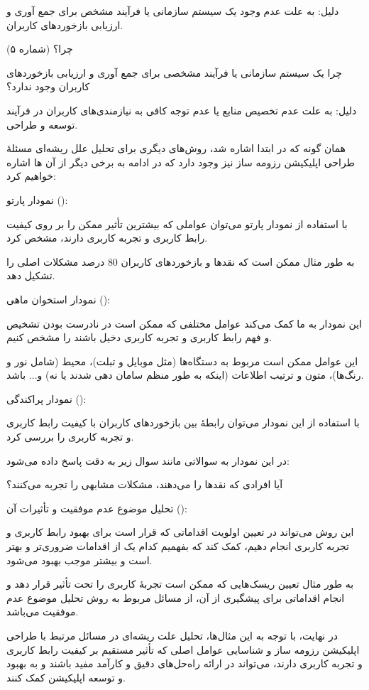 \documentclass[]{article}
\begin{document}
	دلیل: به علت عدم وجود یک سیستم سازمانی یا فرآیند مشخص برای جمع آوری و ارزیابی بازخوردهای کاربران‌.
	
	چرا؟ (شماره ۵)
	
	چرا یک سیستم سازمانی یا فرآیند مشخصی برای جمع آوری و ارزیابی بازخوردهای کاربران‌ وجود ندارد؟
	
	دلیل: به علت عدم تخصیص منابع یا عدم توجه کافی به نیازمندی‌های کاربران در فرآیند توسعه و طراحی.
	
	همان گونه که در ابتدا اشاره شد، روش‌های دیگری برای تحلیل علل ریشه‌ای مسئلۀ طراحی اپلیکیشن رزومه ساز نیز وجود دارد که در ادامه به برخی دیگر از آن ها اشاره خواهیم کرد:
	
	نمودار پارتو ():
	
	با استفاده از نمودار پارتو می‌توان عواملی که بیشترین تأثیر ممکن را بر روی کیفیت رابط کاربری و تجربه کاربری دارند، مشخص کرد.
	
	به طور مثال ممکن است که نقدها و بازخوردهای کاربران 80 درصد مشکلات اصلی را تشکیل دهد.
	
	نمودار استخوان ماهی ():
	
	این نمودار به ما کمک می‌کند عوامل مختلفی که ممکن است در نادرست بودن تشخیص و فهم رابط کاربری و تجربه کاربری دخیل باشند را مشخص کنیم.
	
	این عوامل ممکن است مربوط به دستگاه‌ها (مثل موبایل و تبلت)، محیط (شامل نور و رنگ‌ها)، متون و ترتیب اطلاعات (اینکه به طور منظم سامان دهی شدند یا نه) و... باشد.
	
	نمودار پراکندگی ():
	
	با استفاده از این نمودار می‌توان رابطۀ بین بازخوردهای کاربران با کیفیت رابط کاربری و تجربه کاربری را بررسی کرد. 
	
	در این نمودار به سوالاتی مانند سوال زیر به دقت پاسخ داده می‌شود:
	
	آیا افرادی که نقدها را می‌دهند، مشکلات مشابهی را تجربه می‌کنند؟
	
	تحلیل موضوع عدم موفقیت و تأثیرات آن ():
	
	این روش می‌تواند در تعیین اولویت اقداماتی که قرار است برای بهبود رابط کاربری و تجربه کاربری انجام دهیم، کمک کند که بفهمیم کدام یک از اقدامات ضروری‌تر و بهتر است و بیشتر موجب بهبود می‌شود.
	
	به طور مثال تعیین ریسک‌هایی که ممکن است تجربۀ کاربری را تحت تأثیر قرار دهد و انجام اقداماتی برای پیشگیری از آن، از مسائل مربوط به روش تحلیل موضوع عدم موفقیت می‌باشد.
	
	در نهایت، با توجه به این مثال‌ها، تحلیل علت ریشه‌ای در مسائل مرتبط با طراحی اپلیکیشن رزومه ساز و شناسایی عوامل اصلی که تأثیر مستقیم بر کیفیت رابط کاربری و تجربه کاربری دارند، می‌تواند در ارائه راه‌حل‌های دقیق و کارآمد مفید باشند و به بهبود و توسعه اپلیکیشن کمک کنند.
	
\end{document}
